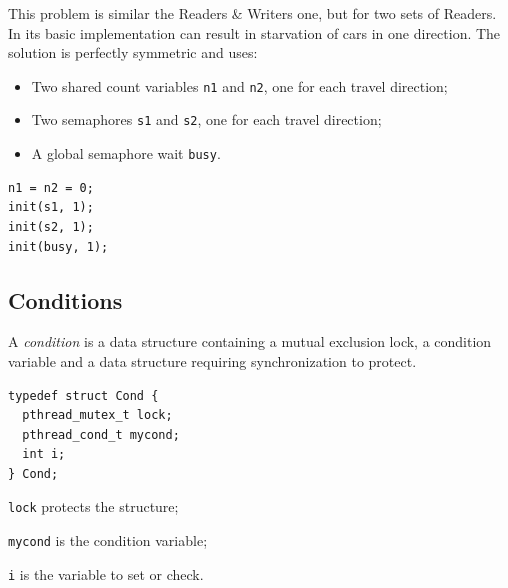 This problem is similar the Readers \& Writers one, but for two sets of Readers. In its basic implementation can result in starvation of cars in one direction. The solution is perfectly symmetric and uses:
\begin{itemize}
\item Two shared count variables \texttt{n1} and \texttt{n2}, one for each travel direction;
\item Two semaphores \texttt{s1} and \texttt{s2}, one for each travel direction;
\item A global semaphore wait \texttt{busy}.
\end{itemize}

\begin{verbatim}
n1 = n2 = 0;
init(s1, 1);
init(s2, 1);
init(busy, 1);
\end{verbatim}

\begin{Parallel}{}{}
\end{Parallel}

\subsection{Conditions}
A \emph{condition} is a data structure containing a mutual exclusion lock, a condition variable and a data structure requiring synchronization to protect.

\begin{verbatim}
typedef struct Cond {
  pthread_mutex_t lock;
  pthread_cond_t mycond;
  int i;
} Cond;
\end{verbatim}

\begin{description}
\item \texttt{lock} protects the structure;
\item \texttt{mycond} is the condition variable;
\item \texttt{i} is the variable to set or check.
\end{description}


